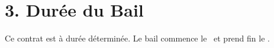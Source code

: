 \section*{3. Durée du Bail}
Ce contrat est à durée déterminée. Le bail commence le \Rentstartdate\ et prend fin le \Rentenddate.
